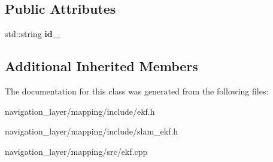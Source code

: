 \subsection*{Public Attributes}
\begin{DoxyCompactItemize}
\item 
\mbox{\label{classmapping_1_1SlamEKF_aa45018ea13cd60958e5cea033e8b96df}} 
std\+::string {\bfseries id\+\_\+}
\end{DoxyCompactItemize}
\subsection*{Additional Inherited Members}


The documentation for this class was generated from the following files\+:\begin{DoxyCompactItemize}
\item 
navigation\+\_\+layer/mapping/include/ekf.\+h\item 
navigation\+\_\+layer/mapping/include/slam\+\_\+ekf.\+h\item 
navigation\+\_\+layer/mapping/src/ekf.\+cpp\end{DoxyCompactItemize}
